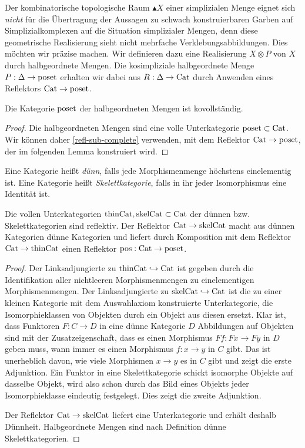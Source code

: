 Der kombinatorische topologische Raum $\blacktriangle X$ einer
simplizialen Menge eignet sich \emph{nicht} für die Übertragung der
Aussagen zu schwach konstruierbaren Garben auf Simplizialkomplexen auf
die Situation simplizialer Mengen, denn diese geometrische
Realisierung sieht nicht mehrfache Verklebungsabbildungen. Dies
möchten wir präzise machen. Wir definieren dazu eine Realisierung $X
\otimes P$ von $X$ durch halbgeordnete Mengen. Die kosimpliziale
halbgeordnete Menge $P: \Delta \to \operatorname{poset}$ erhalten wir dabei aus $R:
\Delta \to \operatorname{Cat}$ durch Anwenden eines Reflektors $\operatorname{Cat} \to \operatorname{poset}$.

\begin{prop} \label{poset-cocomplete}
  Die Kategorie $\operatorname{poset}$ der halbgeordneten Mengen ist kovollständig.
\end{prop}
\begin{proof}
  Die halbgeordneten Mengen sind eine volle Unterkategorie $\operatorname{poset}
  \subset \operatorname{Cat}$. Wir können daher \ref{refl-sub-complete} verwenden,
  mit dem Reflektor $\operatorname{Cat} \to \operatorname{poset}$, der im folgenden Lemma
  konstruiert wird.
\end{proof}
\begin{defn}
  Eine Kategorie heißt \emph{dünn}, falls jede Morphismenmenge
  höchs\-tens einelementig ist. Eine Kategorie heißt
  \emph{Skelettkategorie}, falls in ihr jeder Isomorphismus eine
  Identität ist.
\end{defn}
\begin{lemma} \label{poset-reflective}
  Die vollen Unterkategorien $\mathrm{thinCat}, \mathrm{skelCat}
  \subset \operatorname{Cat}$ der dünnen bzw. Skelettkategorien sind reflektiv. Der
  Reflektor $\operatorname{Cat} \to \mathrm{skelCat}$ macht aus dünnen Kategorien
  dünne Kategorien und liefert durch Komposition mit dem Reflektor
  $\operatorname{Cat} \to \mathrm{thinCat}$ einen Reflektor $\operatorname{pos}: \operatorname{Cat} \to \operatorname{poset}$.
\end{lemma}
\begin{proof}
  Der Linksadjungierte zu $\mathrm{thinCat} \hookrightarrow \operatorname{Cat}$ ist gegeben
  durch die Identifikation aller nichtleeren Morphismenmengen zu
  einelementigen Morphismenmengen. Der Linksadjungierte zu
  $\mathrm{skelCat} \hookrightarrow \operatorname{Cat}$ ist die zu einer kleinen Kategorie mit
  dem Auswahlaxiom konstruierte Unterkategorie, die Isomorphieklassen
  von Objekten durch ein Objekt aus diesen ersetzt. Klar ist, dass
  Funktoren $F: C \to D$ in eine dünne Kategorie $D$ Abbildungen auf
  Objekten sind mit der Zusatzeigenschaft, dass es einen Morphismus
  $Ff: Fx \to Fy$ in $D$ geben muss, wann immer es einen Morphismus
  $f: x \to y$ in $C$ gibt. Das ist unerheblich davon, wie viele
  Morphismen $x \to y$ es in $C$ gibt und zeigt die erste
  Adjunktion. Ein Funktor in eine Skelettkategorie schickt isomorphe
  Objekte auf dasselbe Objekt, wird also schon durch das Bild eines
  Objekts jeder Isomorphieklasse eindeutig festgelegt. Dies zeigt die
  zweite Adjunktion.

  Der Reflektor $\operatorname{Cat} \to \mathrm{skelCat}$ liefert eine
  Unterkategorie und erhält deshalb Dünnheit. Halbgeordnete Mengen
  sind nach Definition dünne Skelettkategorien.
\end{proof}

